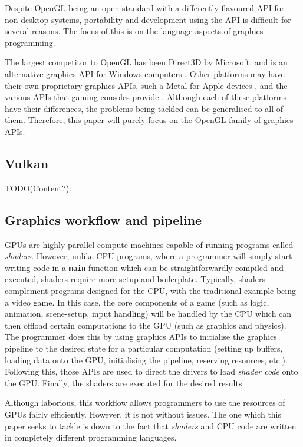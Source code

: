 \documentclass[a4paper,12pt,twoside,openright]{report}
\begin{document}
Despite OpenGL being an open standard with a differently-flavoured API for
non-desktop systems, portability and development using the API is difficult for
several reasons. The focus of this is on the language-aspects of graphics
programming.

The largest competitor to OpenGL has been Direct3D by Microsoft, and is an
alternative graphics API for Windows computers \cite{TODO}. Other platforms may
have their own proprietary graphics APIs, such a Metal for Apple devices
\cite{TODO}, and the various APIs that gaming consoles provide \cite{TODO}.
Although each of these platforms have their differences, the problems being
tackled can be generalised to all of them. Therefore, this paper will purely
focus on the OpenGL family of graphics APIs.

\subsection{Vulkan}

TODO(Content?):

\subsection{Graphics workflow and pipeline}

GPUs are highly parallel compute machines capable of running programs called
\textit{shaders}. However, unlike CPU programs, where a programmer will simply
start writing code in a \texttt{main} function which can be straightforwardly
compiled and executed, shaders require more setup and boilerplate. Typically,
shaders complement programs designed for the CPU, with the traditional example
being a video game. In this case, the core components of a game (such as logic,
animation, scene-setup, input handling) will be handled by the CPU which can
then offload certain computations to the GPU (such as graphics and physics).
The programmer does this by using graphics APIs to initialise the graphics
pipeline to the desired state for a particular computation (setting up buffers,
loading data onto the GPU, initialising the pipeline, reserving resources,
etc.). Following this, those APIs are used to direct the drivers to load
\textit{shader code} onto the GPU. Finally, the shaders are executed for the
desired results.

Although laborious, this workflow allows programmers to use the resources of
GPUs fairly efficiently. However, it is not without issues. The one which this
paper seeks to tackle is down to the fact that \textit{shaders} and CPU code
are written in completely different programming languages.
\end{document}
